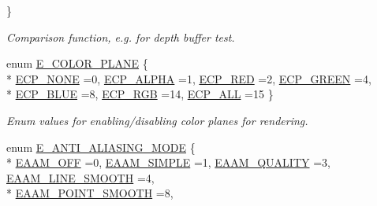 \begin{DoxyCompactItemize}
 \}\begin{DoxyCompactList}\small\item\em Comparison function, e.\+g. for depth buffer test. \end{DoxyCompactList}
\item 
enum \hyperlink{namespaceirr_1_1video_aa9f25191ae536c1a4b08ec5334866a21}{E\+\_\+\+C\+O\+L\+O\+R\+\_\+\+P\+L\+A\+NE} \{ \\*
\hyperlink{namespaceirr_1_1video_aa9f25191ae536c1a4b08ec5334866a21aa5afe366b19c967f884d0bd4ca083df9}{E\+C\+P\+\_\+\+N\+O\+NE} =0, 
\hyperlink{namespaceirr_1_1video_aa9f25191ae536c1a4b08ec5334866a21ad345f3072dec27d31bedb82f1f3011a7}{E\+C\+P\+\_\+\+A\+L\+P\+HA} =1, 
\hyperlink{namespaceirr_1_1video_aa9f25191ae536c1a4b08ec5334866a21a36263a436337ff10be86fc9b5ae2f6d0}{E\+C\+P\+\_\+\+R\+ED} =2, 
\hyperlink{namespaceirr_1_1video_aa9f25191ae536c1a4b08ec5334866a21a1e712fd8781a461da6f0a293a3e7180f}{E\+C\+P\+\_\+\+G\+R\+E\+EN} =4, 
\\*
\hyperlink{namespaceirr_1_1video_aa9f25191ae536c1a4b08ec5334866a21a31e270dab7c29a6e642ac491b172d16d}{E\+C\+P\+\_\+\+B\+L\+UE} =8, 
\hyperlink{namespaceirr_1_1video_aa9f25191ae536c1a4b08ec5334866a21a41d3738a2d0a4c67fa01148b05ee3fc6}{E\+C\+P\+\_\+\+R\+GB} =14, 
\hyperlink{namespaceirr_1_1video_aa9f25191ae536c1a4b08ec5334866a21a674ec773096b1b504b38ed78213e1e38}{E\+C\+P\+\_\+\+A\+LL} =15
 \}\begin{DoxyCompactList}\small\item\em Enum values for enabling/disabling color planes for rendering. \end{DoxyCompactList}
\item 
enum \hyperlink{namespaceirr_1_1video_aa8647c2a52bdd3bc15ee773e8f2b149d}{E\+\_\+\+A\+N\+T\+I\+\_\+\+A\+L\+I\+A\+S\+I\+N\+G\+\_\+\+M\+O\+DE} \{ \\*
\hyperlink{namespaceirr_1_1video_aa8647c2a52bdd3bc15ee773e8f2b149dab88de631372a6fc318762f20f1095433}{E\+A\+A\+M\+\_\+\+O\+FF} =0, 
\hyperlink{namespaceirr_1_1video_aa8647c2a52bdd3bc15ee773e8f2b149da05900b0839b8484a7ff78dbdac7e5dd7}{E\+A\+A\+M\+\_\+\+S\+I\+M\+P\+LE} =1, 
\hyperlink{namespaceirr_1_1video_aa8647c2a52bdd3bc15ee773e8f2b149da25f380a6b1ba75d0dc08ea624974ebd8}{E\+A\+A\+M\+\_\+\+Q\+U\+A\+L\+I\+TY} =3, 
\hyperlink{namespaceirr_1_1video_aa8647c2a52bdd3bc15ee773e8f2b149daa91855f39a1b96c5aadd788663b564d3}{E\+A\+A\+M\+\_\+\+L\+I\+N\+E\+\_\+\+S\+M\+O\+O\+TH} =4, 
\\*
\hyperlink{namespaceirr_1_1video_aa8647c2a52bdd3bc15ee773e8f2b149dab40cf8dfee5fa3a823f2ae34510e63c8}{E\+A\+A\+M\+\_\+\+P\+O\+I\+N\+T\+\_\+\+S\+M\+O\+O\+TH} =8, 

\end{DoxyCompactItemize}
